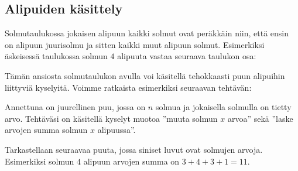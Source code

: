 \subsection{Alipuiden käsittely}

Solmutaulukossa jokaisen alipuun kaikki solmut ovat peräkkäin
niin, että ensin on alipuun juurisolmu ja sitten
kaikki muut alipuun solmut.
Esimerkiksi äskeisessä taulukossa solmun $4$
alipuuta vastaa seuraava taulukon osa:

\begin{center}
\end{center}

Tämän ansiosta solmutaulukon avulla voi käsitellä tehokkaasti
puun alipuihin liittyviä kyselyitä.
Voimme ratkaista esimerkiksi seuraavan tehtävän:

\begin{task}
Annettuna on juurellinen puu, jossa on $n$ solmua
ja jokaisella solmulla on tietty arvo.
Tehtäväsi on käsitellä kyselyt muotoa
''muuta solmun $x$ arvoa'' sekä
''laske arvojen summa solmun $x$ alipuussa''.
\end{task}

Tarkastellaan seuraavaa puuta,
jossa siniset luvut ovat solmujen arvoja.
Esimerkiksi solmun $4$ alipuun arvojen summa on $3+4+3+1=11$.


